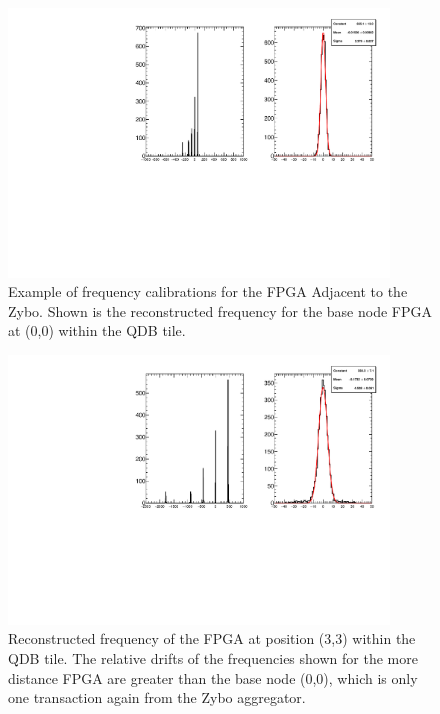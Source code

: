 \begin{figure}[]
\centering
\includegraphics[width=0.9\textwidth]{images/(0,0).pdf}
\caption{Example of frequency calibrations for the FPGA Adjacent to the Zybo.
Shown is the reconstructed frequency for the base node FPGA at (0,0) within the QDB tile.
}
\label{fig:frq_recon_node00}
\end{figure}

\begin{figure}[]
\centering
\includegraphics[width=0.9\textwidth]{images/(3,3).pdf}
\caption{Reconstructed frequency of the FPGA at position (3,3) within the QDB tile.
The relative drifts of the frequencies shown for the more distance FPGA are greater than the base node (0,0), which is only one transaction again from the Zybo aggregator.
}
\label{fig:frq_recon_node33}
\end{figure}

